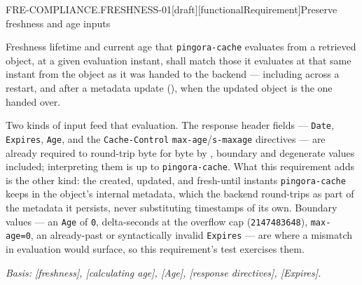 \begin{requirement}{FRE-COMPLIANCE.FRESHNESS-01}[draft][functionalRequirement]{Preserve freshness and age inputs}


  Freshness lifetime and current age that \texttt{pingora-cache} evaluates from a
  retrieved object, at a given evaluation instant, shall match those it
  evaluates at that same instant from the object as it was handed to the
  backend --- including across a restart, and after a metadata update
  (), when the updated object is the
  one handed over.

  Two kinds of input feed that evaluation. The response header fields ---
  \texttt{Date}, \texttt{Expires}, \texttt{Age}, and the
  \texttt{Cache-Control} \texttt{max-age}/\texttt{s-maxage} directives --- are
  already required to round-trip byte for byte by
  , boundary and degenerate values included;
  interpreting them is up to \texttt{pingora-cache}. What this requirement
  adds is the other kind: the created, updated, and fresh-until instants
  \texttt{pingora-cache} keeps in the object's internal metadata, which the
  backend round-trips as part of the metadata it persists, never substituting
  timestamps of its own. Boundary values --- an \texttt{Age} of \texttt{0},
  delta-seconds at the overflow cap (\texttt{2147483648}), \texttt{max-age=0},
  an already-past or syntactically invalid \texttt{Expires} --- are where a
  mismatch in evaluation would surface, so this requirement's test exercises
  them.

  \textit{Basis: [freshness], [calculating age],
  [Age], [response directives],
  [Expires].}



\end{requirement}


